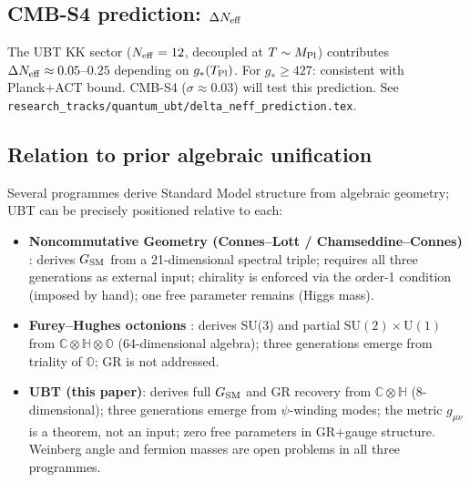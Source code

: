 \documentclass[12pt,a4paper]{article}
\theoremstyle{definition}
\theoremstyle{remark}
\newcommand{\SU}[1]{\mathrm{SU}(#1)}
\newcommand{\UU}[1]{\mathrm{U}(#1)}
\begin{document}
\subsection*{CMB-S4 prediction: $\Delta N_{\rm eff}$}
The UBT KK sector ($N_{\rm eff}=12$, decoupled at $T\sim M_{\rm Pl}$)
contributes $\Delta N_{\rm eff} \approx 0.05$--$0.25$ depending on
$g_*(T_{\rm Pl})$. For $g_* \geq 427$: consistent with Planck+ACT bound.
CMB-S4 ($\sigma \approx 0.03$) will test this prediction.
See
\texttt{research\_tracks/quantum\_ubt/delta\_neff\_prediction.tex}.

\subsection*{Relation to prior algebraic unification}

Several programmes derive Standard Model structure from algebraic geometry;
UBT can be precisely positioned relative to each:

\begin{itemize}
  \item \textbf{Noncommutative Geometry (Connes--Lott / Chamseddine--Connes)}
    \cite{connes2024}: derives $G_{\rm SM}$ from a 21-dimensional spectral triple;
    requires all three generations as external input; chirality is enforced via
    the order-1 condition (imposed by hand); one free parameter remains (Higgs mass).

  \item \textbf{Furey--Hughes octonions} \cite{furey2025}: derives SU(3) and
    partial $\SU{2}\times\UU{1}$ from $\mathbb{C}\otimes\mathbb{H}\otimes\mathbb{O}$
    (64-dimensional algebra); three generations emerge from triality of $\mathbb{O}$;
    GR is not addressed.

  \item \textbf{UBT (this paper)}: derives full $G_{\rm SM}$ and GR recovery from
    $\mathbb{C}\otimes\mathbb{H}$ (8-dimensional); three generations emerge from
    $\psi$-winding modes; the metric $g_{\mu\nu}$ is a theorem, not an input;
    zero free parameters in GR+gauge structure.
    Weinberg angle and fermion masses are open problems in all three programmes.
\end{itemize}
\end{document}

